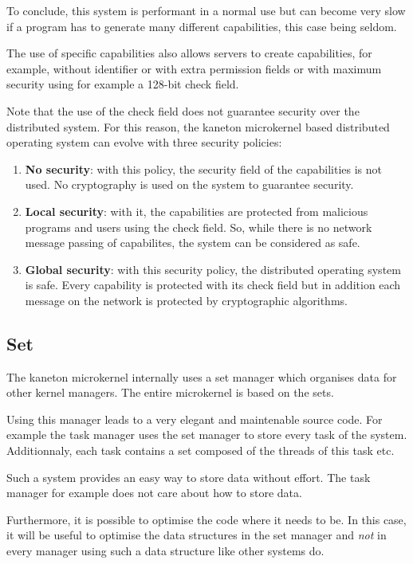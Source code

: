 \begin{multicols}{2}
To conclude, this system is performant in a normal use but can become
very slow if a program has to generate many different capabilities, this
case being seldom.

The use of specific capabilities also allows servers to create capabilities,
for example, without identifier or with extra permission fields or with
maximum security using for example a 128-bit check field.

Note that the use of the check field does not guarantee security over the
distributed system. For this reason, the kaneton microkernel based
distributed operating system can evolve with three security policies:

\begin{enumerate}
  \item
    \textbf{No security}: with this policy, the security field of the
    capabilities is not used. No cryptography is used on the system
    to guarantee security.
  \item
    \textbf{Local security}: with it, the capabilities are protected from
    malicious programs and users using the check field. So, while there
    is no network message passing of capabilites, the system can be
    considered as safe.
  \item
    \textbf{Global security}: with this security policy, the distributed
    operating system is safe. Every capability is protected with its check
    field but in addition each message on the network is protected by
    cryptographic algorithms.
\end{enumerate}

%
%

\subsection{Set}

The kaneton microkernel internally uses a set manager which organises data
for other kernel managers. The entire microkernel is based on the sets.

Using this manager leads to a very elegant and maintenable source code. For
example the task manager uses the set manager to store every task of the
system. Additionnaly, each task contains a set composed of the threads of
this task etc.

Such a system provides an easy way to store data without effort. The task
manager for example does not care about how to store data.

Furthermore, it is possible to optimise the code where it needs to be. In
this case, it will be useful to optimise the data structures in the set
manager and \textit{not} in every manager using such a data structure like
other systems do.


\end{multicols}
